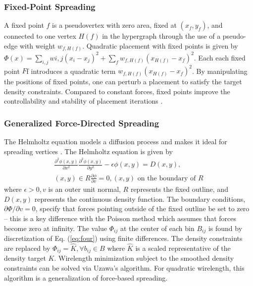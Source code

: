 \documentclass[natbib]{svcyclop}
\begin{document}
\subsubsection{Fixed-Point Spreading} A fixed point $f$ is a pseudovertex
with zero area, fixed at $(x_f,y_f)$, and connected to
one vertex $H(f)$ in the hypergraph through the use of
a pseudo-edge with weight $w_{f,H(f)}$. Quadratic placement
with fixed points is given by $\Phi(x) = \sum_{i,j} w{i,j}(x_i-x_j)^2 +
\sum_fw_{f,H(f)}(x_{H(f)}-x_f)^2$.
Each each fixed point $F$f introduces
a quadratic term $w_{f,H(f)}(x_{H(f)}-x_f)^2$. By manipulating
the positions of fixed points, one can perturb a placement
to satisfy the target density constraints. Compared
to constant forces, fixed points improve the controllability
and stability of placement iterations \cite{HuMar05}.

\subsubsection{Generalized Force-Directed Spreading} The Helmholtz
equation models a diffusion process and makes it ideal for
spreading vertices \cite{ChaConSze05}. The Helmholtz equation is given by
\begin{gather}\label{eq:four}
\frac{\partial^2\phi(x,y)}{\partial x^2}
\frac{\partial^2\phi(x,y)}{\partial y^2}-
\epsilon\phi(x,y)=D(x,y),\\
(x,y)\in R\frac{\partial \phi}{\partial v}= 0,
(x,y) \text{ on the boundary of } R\nonumber
\end{gather}
where $\epsilon>0, v$ is an outer unit normal, $R$ represents the
fixed outline, and $D(x,y)$ represents the continuous density
function. The boundary conditions, $\partial\Phi/\partial v = 0$, specify
that forces pointing outside of the fixed outline be set
to zero -- this is a key difference with the Poisson method
which assumes that forces become zero at infinity. The
value $\Phi_{ij}$ at the center of each bin $B_{ij}$ is found by discretization
of Eq. (\ref{eq:four}) using finite differences. The density constraints
are replaced by $\Phi_{ij}=\hat K,\forall b_{ij}\in B$ where $\hat K$ is
a scaled representative of the density target $K$. Wirelength
minimization subject to the smoothed density constraints
can be solved via Uzawa's algorithm. For quadratic wirelength,
this algorithm is a generalization of force-based
spreading.
\end{document}
